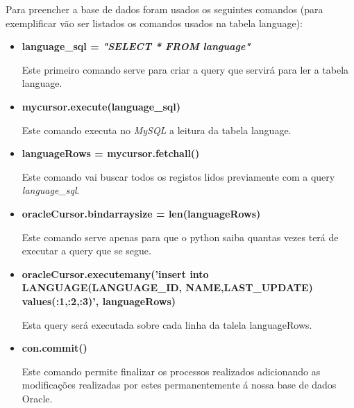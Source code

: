 \par Para preencher a base de dados foram usados os seguintes comandos (para exemplificar vão ser listados os comandos usados na tabela language):\newline
\begin{itemize}
\item \textbf{language\_sql = \textit{"SELECT * FROM language"}}


\par Este primeiro comando serve para criar a query que servirá para ler a tabela language. \newline

\item \textbf{mycursor.execute(language\_sql)}


\par Este comando executa no \textit{MySQL} a leitura da tabela language.\newline

\item \textbf{languageRows = mycursor.fetchall()}


\par Este comando vai buscar todos os registos lidos previamente com a query \textit{language\_sql}.\newline

\item \textbf{oracleCursor.bindarraysize = len(languageRows)}


\par Este comando serve apenas para que o python saiba quantas vezes terá de executar a query que se segue.\newline



\item \textbf{oracleCursor.executemany('insert into LANGUAGE(LANGUAGE\_ID, NAME,LAST\_UPDATE) values(:1,:2,:3)', languageRows)}


\par Esta query será executada sobre cada linha da talela languageRows.\newline

\item \textbf{con.commit()}


\par Este comando permite finalizar os processos realizados adicionando as modificações realizadas por estes permanentemente á nossa base de dados Oracle.


\end{itemize}

